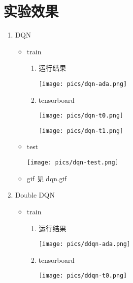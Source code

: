 \documentclass[a4paper,12pt]{article}
\begin{document}
\section{实验效果}
\begin{enumerate}
    \item DQN
    \begin{itemize}
        \item train 
        \begin{enumerate}
            \item 运行结果
            \begin{figure*}[h!]
                \centering
                \texttt{[image: pics/dqn-ada.png]}
            \end{figure*}
            \item tensorboard
            \begin{figure*}[h!]
                \centering
                \texttt{[image: pics/dqn-t0.png]}
            \end{figure*}
            \begin{figure*}[h!]
                \centering
                \texttt{[image: pics/dqn-t1.png]}
            \end{figure*}
        \end{enumerate}
        \newpage
        \item test
        \begin{figure*}[h!]
            \centering
            \texttt{[image: pics/dqn-test.png]}
        \end{figure*}
        \item gif 见 dqn.gif
    \end{itemize}
    \item Double DQN
    \begin{itemize}
        \item train 
        \begin{enumerate}
            \item 运行结果
            \begin{figure*}[h!]
                \centering
                \texttt{[image: pics/ddqn-ada.png]}
            \end{figure*}
            \item tensorboard
            \begin{figure*}[h!]
                \centering
                \texttt{[image: pics/ddqn-t0.png]}
            \end{figure*}

\end{enumerate}
\end{itemize}
\end{enumerate}
\end{document}
